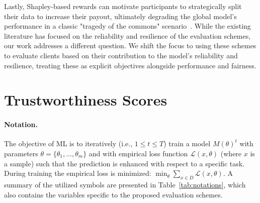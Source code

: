 \documentclass{uai2026}
\begin{document}
Lastly, Shapley-based rewards can motivate participants to strategically split their data to increase their payout, ultimately degrading the global model's performance in a classic "tragedy of the commons" scenario~\cite{qi2024mechanism}. While the existing literature has focused on the reliability and resilience of the evaluation schemes, our work addresses a different question. We shift the focus to using these schemes to evaluate clients based on their contribution to the model's reliability and resilience, treating these as explicit objectives alongside performance and fairness.

\section{Trustworthiness Scores}
\label{sec:mod}


\paragraph{Notation. }

The objective of ML is to iteratively (i.e., $1\leq t \leq T$) train a model $M(\theta)^t$ with parameters $\theta=\{\theta_1,\dots,\theta_m\}$ and with empirical loss function $\mathcal{L}(x,\theta)$ (where $x$ is a sample) such that the prediction is enhanced with respect to a specific task. During training the empirical loss is minimized: $\min_\theta \sum_{x\in D}\mathcal{L}(x,\theta)$. A summary of the utilized symbols are presented in Table~\ref{tab:notations}, which also contains the variables specific to the proposed evaluation schemes.
\end{document}
